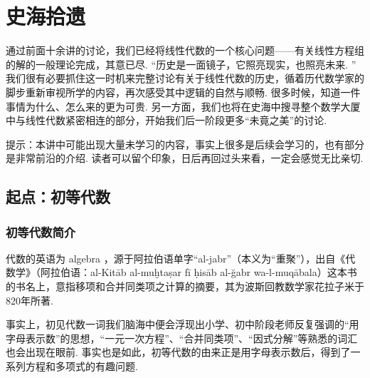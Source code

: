 \chapter{史海拾遗} \label{chap:史海拾遗}

通过前面十余讲的讨论，我们已经将线性代数的一个核心问题——有关线性方程组的解的一般理论完成，其意已尽. ``历史是一面镜子，它照亮现实，也照亮未来. '' 我们很有必要抓住这一时机来完整讨论有关于线性代数的历史，循着历代数学家的脚步重新审视所学的内容，再次感受其中逻辑的自然与顺畅. 很多时候，知道一件事情为什么、怎么来的更为可贵. 另一方面，我们也将在史海中搜寻整个数学大厦中与线性代数紧密相连的部分，开始我们后一阶段更多``未竟之美''的讨论.

提示：本讲中可能出现大量未学习的内容，事实上很多是后续会学习的，也有部分是非常前沿的介绍. 读者可以留个印象，日后再回过头来看，一定会感觉无比亲切.

\section{起点：初等代数}

\subsection{初等代数简介}

代数的英语为 algebra ，源于阿拉伯语单字``al-jabr''（本义为``重聚''），出自《代数学》（阿拉伯语：al-Kitāb al-muḫtaṣar fī ḥisāb al-ğabr wa-l-muqābala）这本书的书名上，意指移项和合并同类项之计算的摘要，其为波斯回教数学家花拉子米于820年所著.

事实上，初见代数一词我们脑海中便会浮现出小学、初中阶段老师反复强调的``用字母表示数''的思想，``一元一次方程''、``合并同类项''、``因式分解''等熟悉的词汇也会出现在眼前. 事实也是如此，初等代数的由来正是用字母表示数后，得到了一系列方程和多项式的有趣问题.

